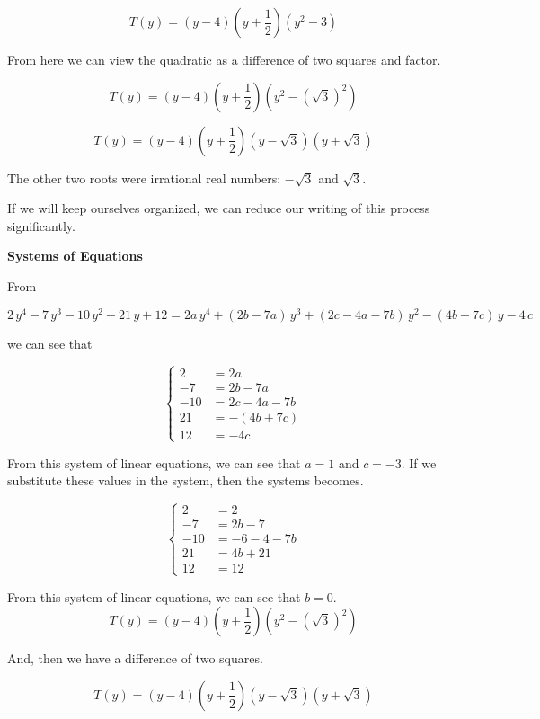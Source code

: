 \documentclass{ximera}
\begin{document}
\begin{explanation}
\[
T(y) = (y-4) \left(y+\frac{1}{2}\right) (y^2  - 3)
\]


From here we can view the quadratic as a difference of two squares and factor. 



\[
T(y) = (y-4) \left(y+\frac{1}{2}\right) (y^2 - (\sqrt{3})^2)
\]



\[
T(y) = (y-4) \left(y+\frac{1}{2}\right) (y - \sqrt{3}) (y + \sqrt{3})
\]


The other two roots were irrational real numbers: $-\sqrt{3}$ and $\sqrt{3}$.


\end{explanation}

If we will keep ourselves organized, we can reduce our writing of this process significantly.




\begin{procedure} \textbf{\textcolor{purple!85!blue}{Systems of Equations}} 



From

\[
2 \, y^4 - 7 \, y^3 - 10 \, y^2 + 21 \, y + 12 = 2 a \, y^4 + (2 b - 7 a) \, y^3 + (2 c - 4 a - 7 b) \, y^2 - (4 b + 7 c) \, y - 4 \, c
\]

we can see that 




\[
\begin{cases}
  2 &= 2 a   \\
  -7 &= 2 b - 7 a    \\
  -10 &= 2 c - 4 a - 7 b   \\
  21 &= -(4 b + 7 c)   \\
  12 &= -4 c
\end{cases}
\]


From this system of linear equations, we can see that $a = 1$ and $c = -3$.  If we substitute these values in the system, then the systems becomes.






\[
\begin{cases}
  2 &= 2   \\
  -7 &= 2 b - 7     \\
  -10 &= -6 - 4 - 7 b   \\
  21 &= 4 b + 21   \\
  12 &= 12
\end{cases}
\]

From this system of linear equations, we can see that $b = 0$. \\


\[
T(y) = (y-4) \left(y+\frac{1}{2}\right) (y^2 - (\sqrt{3})^2)
\]



And, then we have a difference of two squares.



\[
T(y) = (y-4) \left(y+\frac{1}{2}\right) (y - \sqrt{3}) (y + \sqrt{3})
\]




\end{procedure}
\end{document}
